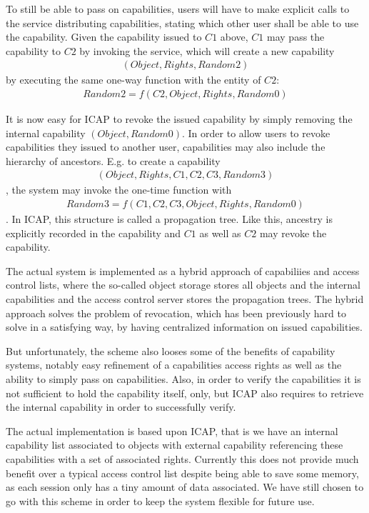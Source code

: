 To still be able to pass on capabilities, users will have to make explicit calls to the service distributing capabilities, stating which other user shall be able to use the capability.
Given the capability issued to $C1$ above, $C1$ may pass the capability to $C2$ by invoking the service, which will create a new capability 
\begin{align*}
    (Object, Rights, Random2)
\end{align*}
by executing the same one-way function with the entity of $C2$:
\begin{align*}
    Random2 = f(C2, Object, Rights, Random0)
\end{align*}

It is now easy for ICAP to revoke the issued capability by simply removing the internal capability $(Object, Random0)$.
In order to allow users to revoke capabilities they issued to another user, capabilities may also include the hierarchy of ancestors.
E.g. to create a capability
\begin{align*}
    (Object, Rights, C1, C2, C3, Random3)
\end{align*},
the system may invoke the one-time function with
\begin{align*}
    Random3 = f(C1, C2, C3, Object, Rights, Random0)
\end{align*}.
In ICAP, this structure is called a propagation tree.
Like this, ancestry is explicitly recorded in the capability and $C1$ as well as $C2$ may revoke the capability.

The actual system is implemented as a hybrid approach of capabiliies and access control lists, where the so-called object storage stores all objects and the internal capabilities and the access control server stores the propagation trees.
The hybrid approach solves the problem of revocation, which has been previously hard to solve in a satisfying way, by having centralized information on issued capabilities.


But unfortunately, the scheme also looses some of the benefits of capability systems, notably easy refinement of a capabilities access rights as well as the ability to simply pass on capabilities.
Also, in order to verify the capabilities it is not sufficient to hold the capability itself, only, but ICAP also requires to retrieve the internal capability in order to successfully verify.

\bigskip

The actual implementation is based upon ICAP, that is we have an internal capability list associated to objects with external capability referencing these capabilities with a set of associated rights.
Currently this does not provide much benefit over a typical access control list despite being able to save some memory, as each session only has a tiny amount of data associated.
We have still chosen to go with this scheme in order to keep the system flexible for future use.

